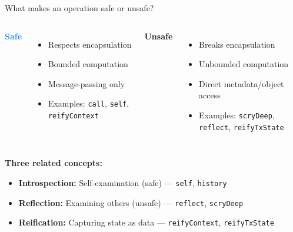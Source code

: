\documentclass[handout,aspectratio=169,xcolor=dvipsnames,10pt]{beamer}
\begin{document}
\begin{frame}{What makes an operation safe or unsafe?}

\begin{columns}[T]
\textcolor{dodgerblue}{\textbf{Safe}}
\begin{itemize}
  \item Respects encapsulation
  \item Bounded computation
  \item Message-passing only
  \item Examples: \texttt{call}, \texttt{self}, \texttt{reifyContext}
\end{itemize}

\textcolor{nicered}{\textbf{Unsafe}}
\begin{itemize}
  \item Breaks encapsulation
  \item Unbounded computation
  \item Direct metadata/object access
  \item Examples: \texttt{scryDeep}, \texttt{reflect}, \texttt{reifyTxState}
\end{itemize}
\end{columns}

\vspace{1em}

\textbf{Three related concepts:}
\begin{itemize}
  \item \textbf{Introspection:} Self-examination (safe) — \texttt{self}, \texttt{history}
  \item \textbf{Reflection:} Examining others (unsafe) — \texttt{reflect}, \texttt{scryDeep}
  \item \textbf{Reification:} Capturing state as data — \texttt{reifyContext}, \texttt{reifyTxState}
\end{itemize}

\end{frame}


% 
\end{document}

